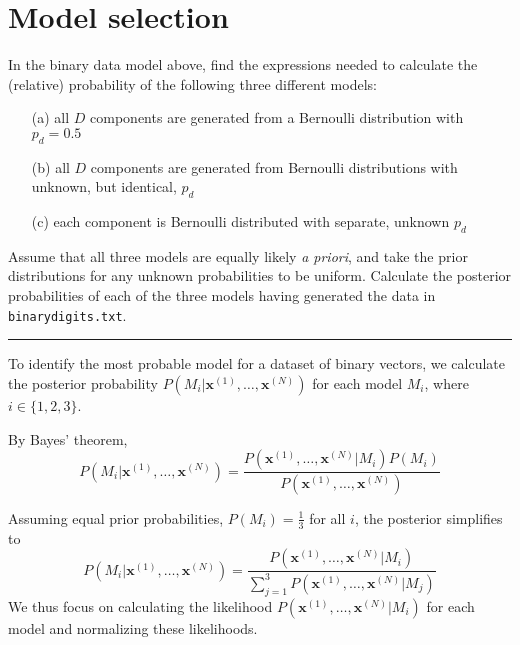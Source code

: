 \documentclass{article}
\begin{document}
\section{Model selection}
    
In the binary data model above, find the expressions needed to calculate the (relative) probability of the following three different models:
    
\begin{enumerate}
    \item[(a)] all $D$ components are generated from a Bernoulli distribution with $p_d = 0.5$
    \item[(b)] all $D$ components are generated from Bernoulli distributions with unknown, but identical, $p_d$
    \item[(c)] each component is Bernoulli distributed with separate, unknown $p_d$
\end{enumerate}
    
\noindent Assume that all three models are equally likely \textit{a priori}, and take the prior distributions for any unknown probabilities to be uniform. Calculate the posterior probabilities of each of the three models having generated the data in \texttt{binarydigits.txt}.

    \noindent\textcolor{gray}{\rule{0.1\linewidth}{0.4pt}}

    
    \vspace{10pt}

    \noindent To identify the most probable model for a dataset of binary vectors, we calculate the posterior probability \( P(M_i | \mathbf{x}^{(1)}, \dots, \mathbf{x}^{(N)}) \) for each model \( M_i \), where \( i \in \{1, 2, 3\} \).
    \vspace{5pt}
    
    \noindent By Bayes' theorem,
    \begin{equation}
        P(M_i | \mathbf{x}^{(1)}, \dots, \mathbf{x}^{(N)}) = \frac{P(\mathbf{x}^{(1)}, \dots, \mathbf{x}^{(N)} | M_i) P(M_i)}{P(\mathbf{x}^{(1)}, \dots, \mathbf{x}^{(N)})}
    \end{equation}
    
    \noindent Assuming equal prior probabilities, \( P(M_i) = \frac{1}{3} \) for all \( i \), the posterior simplifies to
    \begin{equation}
        P(M_i | \mathbf{x}^{(1)}, \dots, \mathbf{x}^{(N)}) = \frac{P(\mathbf{x}^{(1)}, \dots, \mathbf{x}^{(N)} | M_i)}{\sum_{j=1}^{3} P(\mathbf{x}^{(1)}, \dots, \mathbf{x}^{(N)} | M_j)}
    \end{equation}
    We thus focus on calculating the likelihood \( P(\mathbf{x}^{(1)}, \dots, \mathbf{x}^{(N)} | M_i) \) for each model and normalizing these likelihoods.
    
\end{document}

